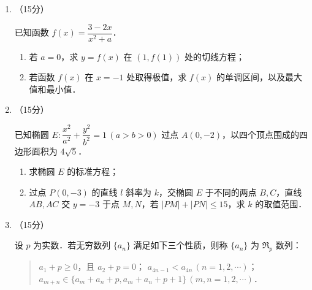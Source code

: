 \begin{description}
\begin{enumerate}[leftmargin=5pt]
        \begin{enumerate}[label=(\arabic*)]
            \item 将这100人随机分成10组，每组10人，且对每组都采用"10合1"混采核酸检测．
            \begin{enumerate}[label=(\roman*)]
                \item 如果感染新冠病毒的2人在同一组，求检测的总次数；
                \item 已知感染新冠病毒的2人分在同一组的概率为 $\dfrac{1}{11}$．设 $X$ 是检测的总次数，求 $X$ 的分布列与数学期望 $E(X)$．
            \end{enumerate}
            \item 将这100人随机分成20组，每组5人，且对每组都采用"5合1"混采核酸检测．设 $Y$ 是检测的总次数，试判断数学期望 $E(Y)$ 与(1)中 $E(X)$ 的大小．（结论不要求证明）
        \end{enumerate}

        \item （15分）

        已知函数 $f(x)=\dfrac{3-2x}{x^2+a}$．

        \begin{enumerate}[label=(\arabic*)]
            \item 若 $a=0$，求 $y=f(x)$ 在 $(1,f(1))$ 处的切线方程；
            \item 若函数 $f(x)$ 在 $x=-1$ 处取得极值，求 $f(x)$ 的单调区间，以及最大值和最小值．
        \end{enumerate}

        \item （15分）

        已知椭圆 $E:\dfrac{x^2}{a^2}+\dfrac{y^2}{b^2}=1\,(a>b>0)$ 过点 $A(0,-2)$，以四个顶点围成的四边形面积为 $4\sqrt{5}$．

        \begin{enumerate}[label=(\arabic*)]
            \item 求椭圆 $E$ 的标准方程；
            \item 过点 $P(0,-3)$ 的直线 $l$ 斜率为 $k$，交椭圆 $E$ 于不同的两点 $B,C$，直线 $AB,AC$ 交 $y=-3$ 于点 $M,N$，若 $|PM|+|PN|\leqslant15$，求 $k$ 的取值范围．
        \end{enumerate}

        \item （15分）

        设 $p$ 为实数．若无穷数列 $\{a_n\}$ 满足如下三个性质，则称 $\{a_n\}$ 为 $\Re_p$ 数列：
        \begin{quote}
        $a_1+p\geqslant0$，且 $a_2+p=0$；
        $a_{4n-1}<a_{4n}\,(n=1,2,\cdots)$；
        $a_{m+n}\in\{a_m+a_n+p,a_m+a_n+p+1\}\,(m,n=1,2,\cdots)$．
        \end{quote}


\end{enumerate}
\end{description}
